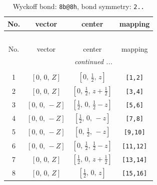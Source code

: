 \documentclass[fleqn,8pt]{jsarticle}
\begin{document}
\begin{longtable}{cccc}
\caption{Wyckoff bond: {\tt 8b@8h}, bond symmetry: {\tt 2..}}
 \\
 \hline \hline
No. & vector & center & mapping \\ \hline \endfirsthead

\multicolumn{3}{l}{\tablename\ \thetable{}} \\
 \hline \hline
No. & vector & center & mapping \\ \hline \endhead

 \hline \hline
\multicolumn{3}{r}{\footnotesize\it continued ...} \\ \endfoot

 \hline \hline
\multicolumn{3}{r}{} \\ \endlastfoot

1 & $\left[ 0,\, 0,\, Z \right]$ & $\left[ 0,\, \frac{1}{2},\, z \right]$ & {\tt [1,2]} \\ \hline
2 & $\left[ 0,\, 0,\, Z \right]$ & $\left[ 0,\, \frac{1}{2},\, z + \frac{1}{2} \right]$ & {\tt [3,4]} \\ \hline
3 & $\left[ 0,\, 0,\, - Z \right]$ & $\left[ \frac{1}{2},\, 0,\, \frac{1}{2} - z \right]$ & {\tt [5,6]} \\ \hline
4 & $\left[ 0,\, 0,\, - Z \right]$ & $\left[ \frac{1}{2},\, 0,\, - z \right]$ & {\tt [7,8]} \\ \hline
5 & $\left[ 0,\, 0,\, - Z \right]$ & $\left[ 0,\, \frac{1}{2},\, - z \right]$ & {\tt [9,10]} \\ \hline
6 & $\left[ 0,\, 0,\, - Z \right]$ & $\left[ 0,\, \frac{1}{2},\, \frac{1}{2} - z \right]$ & {\tt [11,12]} \\ \hline
7 & $\left[ 0,\, 0,\, Z \right]$ & $\left[ \frac{1}{2},\, 0,\, z + \frac{1}{2} \right]$ & {\tt [13,14]} \\ \hline
8 & $\left[ 0,\, 0,\, Z \right]$ & $\left[ \frac{1}{2},\, 0,\, z \right]$ & {\tt [15,16]} \\
\end{longtable}
\renewcommand{\arraystretch}{1.2}
\end{document}
